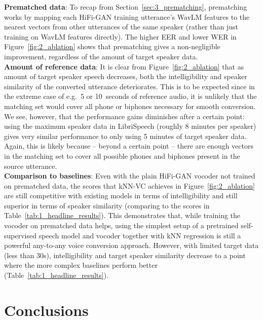 \documentclass{INTERSPEECH2023}
\def\modelname{{kNN-VC}}
\begin{document}
\noindent \textbf{Prematched data}: 
To recap from Section~\ref{sec:3_prematching}, prematching works by mapping each HiFi-GAN training utterance's WavLM features to the nearest  vectors from other utterances of the same speaker (rather than just training on WavLM features directly). The higher EER and lower WER in Figure~\ref{fig:2_ablation} shows that prematching gives
a non-negligible improvement, regardless of the amount of target speaker data. \\ 
\noindent \textbf{Amount of reference data}: 
It is clear from Figure~\ref{fig:2_ablation} that as
amount of target speaker speech
decreases,
both the intelligibility and speaker similarity of the converted utterance deteriorates.
This is to be expected since in the extreme case of e.g.\ 5 or 10~seconds of reference audio, it is unlikely that the matching set 
would cover
all phone or biphones necessary for smooth conversion.
We see, however, that the performance gains diminishes after a certain point:
using the maximum speaker data in LibriSpeech (roughly 8 minutes per speaker)
gives
very similar performance to only using 5 minutes of target speaker data.
Again, this is likely because -- beyond a certain point -- there are enough vectors in the matching set to cover all possible phones and biphones present in the source utterance. \\

\noindent \textbf{Comparison to baselines}: Even with the plain HiFi-GAN vocoder not trained on prematched data, the scores that \modelname{} achieves in Figure~\ref{fig:2_ablation} are still competitive with existing models in terms of intelligibility and still superior in terms of speaker similarity (comparing to the scores in Table~\ref{tab:1_headline_results}).
This demonstrates that, while training the vocoder on prematched data helps, using the simplest setup of a pretrained self-supervised speech model and vocoder together with kNN regression is still a powerful any-to-any voice conversion approach. However, with limited target data (less than 30s),  intelligibility and target speaker similarity decrease to a point where the more complex baselines perform better (Table~\ref{tab:1_headline_results}).


\section{Conclusions}
\end{document}
